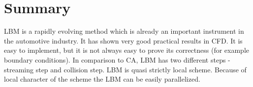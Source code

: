 
\section{Summary}

LBM is a rapidly evolving method which is already an important instrument in the automotive industry. It has shown very good practical results in CFD. It is easy to implement, but it is not always easy to prove its correctness (for example boundary conditions). In comparison to CA, LBM has two different steps - streaming step and collision step. LBM is quasi strictly local scheme. Because of local character of the scheme the LBM can be easily parallelized.
